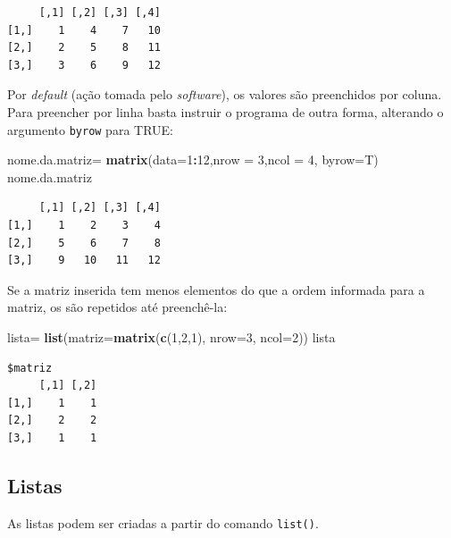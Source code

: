 \documentclass[12pt,brazil,oneside]{book}
\newenvironment{Shaded}{\begin{snugshade}}{\end{snugshade}}
\newcommand{\DataTypeTok}[1]{\textcolor[rgb]{0.13,0.29,0.53}{#1}}
\newcommand{\DecValTok}[1]{\textcolor[rgb]{0.00,0.00,0.81}{#1}}
\newcommand{\KeywordTok}[1]{\textcolor[rgb]{0.13,0.29,0.53}{\textbf{#1}}}
\newcommand{\NormalTok}[1]{#1}
\newcommand{\OperatorTok}[1]{\textcolor[rgb]{0.81,0.36,0.00}{\textbf{#1}}}
\newcommand{\StringTok}[1]{\textcolor[rgb]{0.31,0.60,0.02}{#1}}
\begin{document}
\begin{verbatim}
     [,1] [,2] [,3] [,4]
[1,]    1    4    7   10
[2,]    2    5    8   11
[3,]    3    6    9   12
\end{verbatim}

Por \emph{default} (ação tomada pelo \emph{software}), os valores são
preenchidos por coluna. Para preencher por linha basta instruir o
programa de outra forma, alterando o argumento \texttt{byrow} para TRUE:

\begin{Shaded}
\begin{Highlighting}[]
\NormalTok{nome.da.matriz=}\StringTok{ }\KeywordTok{matrix}\NormalTok{(}\DataTypeTok{data=}\DecValTok{1}\OperatorTok{:}\DecValTok{12}\NormalTok{,}\DataTypeTok{nrow =} \DecValTok{3}\NormalTok{,}\DataTypeTok{ncol =} \DecValTok{4}\NormalTok{, }\DataTypeTok{byrow=}\NormalTok{T)}
\NormalTok{nome.da.matriz}
\end{Highlighting}
\end{Shaded}

\begin{verbatim}
     [,1] [,2] [,3] [,4]
[1,]    1    2    3    4
[2,]    5    6    7    8
[3,]    9   10   11   12
\end{verbatim}

Se a matriz inserida tem menos elementos do que a ordem informada para a
matriz, os são repetidos até preenchê-la:

\begin{Shaded}
\begin{Highlighting}[]
\NormalTok{lista=}\StringTok{ }\KeywordTok{list}\NormalTok{(}\DataTypeTok{matriz=}\KeywordTok{matrix}\NormalTok{(}\KeywordTok{c}\NormalTok{(}\DecValTok{1}\NormalTok{,}\DecValTok{2}\NormalTok{,}\DecValTok{1}\NormalTok{), }\DataTypeTok{nrow=}\DecValTok{3}\NormalTok{, }\DataTypeTok{ncol=}\DecValTok{2}\NormalTok{))}
\NormalTok{lista}
\end{Highlighting}
\end{Shaded}

\begin{verbatim}
$matriz
     [,1] [,2]
[1,]    1    1
[2,]    2    2
[3,]    1    1
\end{verbatim}

\hypertarget{listas}{%
\subsection{Listas}\label{listas}}

As listas podem ser criadas a partir do comando \texttt{list()}.
\end{document}
